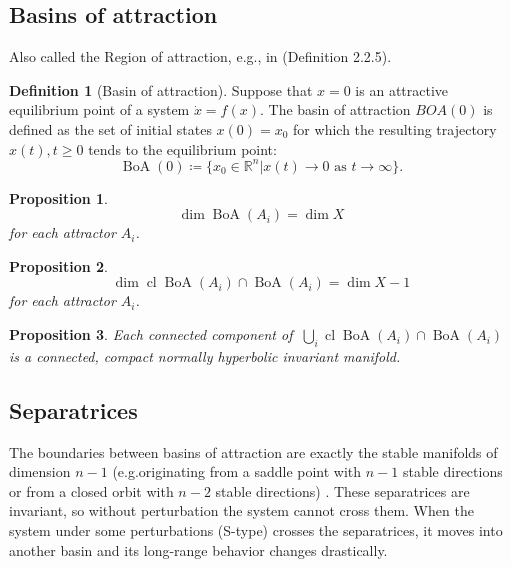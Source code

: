 \documentclass{article}
\newtheorem{proposition}{Proposition}
\theoremstyle{definition} \newtheorem{definition}{Definition}
\theoremstyle{remark} \newtheorem{remark}{Remark}
\newcommand{\reals}{\mathbb{R}}
\newcommand{\cl}{\operatorname{cl}}
\newcommand{\boa}{\operatorname{BoA}}
\newcounter{ct}
\begin{document}

\subsection{Basins of attraction}\label{sec:boa}
\citep{milnor1985attractor}
\citep{hirsch1995computing}

Also called the Region of attraction, e.g., in \citep{garces2012strategies} (Definition 2.2.5).
\begin{definition}[Basin of attraction]
Suppose that $x=0$ is an attractive equilibrium point of a system $\dot x = f(x)$.
The basin of attraction $BOA(0)$ is defined as the set of initial states $x(0)=x_0$ for which the resulting trajectory $x(t), t\geq 0$ tends to the equilibrium point:
\begin{equation}
\boa(0) \coloneqq \{x_0\in \reals^n|x(t)\rightarrow0\text{ as } t\rightarrow\infty\}.
\end{equation}

\end{definition}


\begin{proposition}
\[\dim \boa(A_i) = \dim X\] for each attractor $A_i$.
\end{proposition}
\begin{proposition}
\[\dim\cl \boa(A_i) \cap \boa(A_i) = \dim X - 1 \] for each attractor $A_i$.
\end{proposition}



\begin{proposition}
Each connected component of $\ \bigcup_i\cl \boa(A_i) \cap \boa(A_i) $ is a connected, compact normally hyperbolic invariant manifold. %
\end{proposition}


\subsection{Separatrices}\label{sec:sep}
The boundaries between basins of attraction are exactly the stable manifolds of dimension $n-1$ (e.g.originating from a saddle point with $n-1$ stable directions 
or from a closed orbit with $n-2$ stable directions) \citep{gruemm1975stable}.
These separatrices are invariant, so without  perturbation the system cannot cross them.
When the system under some perturbations (S-type) crosses the separatrices, it moves into another basin and its long-range behavior changes drastically.
\end{document}
